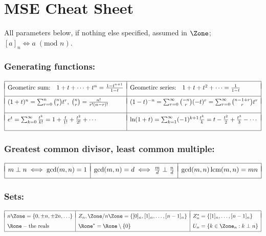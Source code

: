 \documentclass[a4paper]{article}
\begin{document}
\section*{MSE Cheat Sheet}

All parameters below, if nothing else specified, assumed in $\Zone$; $[a]_n \iff a\; (\mbox{mod } n)$.

\subsubsection*{Generating functions:} \vspace{-1.2em}%
\[
  \begin{array}[t]{|ll|ll|}
    \hline
    &&& \\[-9pt]
    \mbox{Geometirc sum:} & 1+t+\cdots+t^n = \frac{1-t^{n+1}}{1-t} &
    \mbox{Geometirc series:} & 1+t+t^2+\cdots = \frac{1}{1-t}
    \\[7pt]\hline
    &&& \\[-9pt]
    \multicolumn{2}{|l|}{(1+t)^n = \sum_{r=0}^{n} \binom nr t^r, \; \binom nr = \frac{n!}{r!(n-r)!}} &
    \multicolumn{2}{l|}{(1-t)^{-n} = \sum_{r=0}^{\infty} \binom {-n}r (-t)^r = \sum_{r=0}^{\infty}\binom {n-1+r}r t^r}
    \\[11pt]\hline
    &&& \\[-9pt]
    \multicolumn{2}{|l|}{e^t = \sum_{k=0}^{\infty} \frac{t^k}{k!} =  1 + \frac{t}{1!} + \frac{t^2}{2!} + \cdots}&
    \multicolumn{2}{l|}{\ln(1+t) = \sum_{k=1}^{\infty}(-1)^{k+1}\frac{t^k}{k} =  t - \frac{t^2}{2} + \frac{t^3}{3} - \cdots}
    \\[11pt]\hline

  \end{array}
\]%

\subsubsection*{Greatest common divisor, least common multiple:} \vspace{-1.2em}%
\[
  \begin{array}[t]{|*{3}{l|}}
    \hline
    && \\[-8pt]
    m\perp n \iff \gcd(m,n)=1 & \gcd(m,n) = d \iff \frac md\perp\frac nd & \gcd(m,n)\,\mbox{lcm}(m,n) = mn
 \\[6pt] \hline
  \end{array}
\]%

\subsubsection*{Sets:} \vspace{-2.5em} %
\[
  \begin{array}[t]{|*{3}{l|}}
 \hline
    && \\[-8pt]
   n\Zone = \{0,\pm n,\pm 2n,\ldots \}
 & Z_n,\Zone/n\Zone = \{[0]_n,[1]_n,\ldots,[n-1]_n\}
 & Z_n^* = \{[1]_n,\ldots,[n-1]_n\} \\[6pt]
   \Rone - \mbox{the reals}
 & \Rone^* = \Rone\setminus\{0\}
 & U_n = \{k\in\Zone_n: k\perp n\}
 \\[3pt] \hline
  \end{array}
\]%
\end{document}
